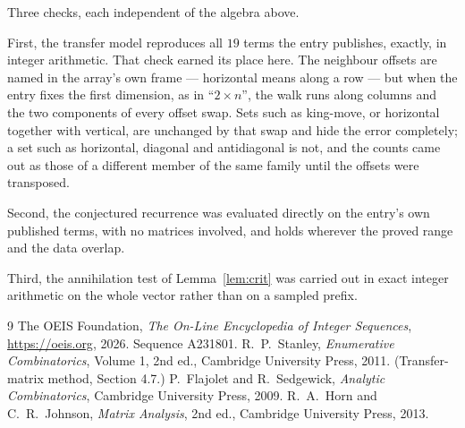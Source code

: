 \documentclass[11pt,a4paper]{article}
\theoremstyle{plain}
\theoremstyle{definition}
\begin{document}
Three checks, each independent of the algebra above.

First, the transfer model reproduces all $19$ terms the entry publishes, exactly, in
integer arithmetic. That check earned its place here. The neighbour offsets are named in the
array's own frame --- horizontal means along a row --- but when the entry fixes the first
dimension, as in ``$2\times n$'', the walk runs along columns and the two components of every
offset swap. Sets such as king-move, or horizontal together with vertical, are unchanged by
that swap and hide the error completely; a set such as horizontal, diagonal and antidiagonal
is not, and the counts came out as those of a different member of the same family until the
offsets were transposed.

Second, the conjectured recurrence was evaluated directly on the entry's own published terms,
with no matrices involved, and holds wherever the proved range and the data overlap.

Third, the annihilation test of Lemma~\ref{lem:crit} was carried out in exact integer
arithmetic on the whole vector rather than on a sampled prefix.

\begin{thebibliography}{9}
 The OEIS Foundation, \emph{The On-Line Encyclopedia of Integer
Sequences}, \url{https://oeis.org}, 2026. Sequence A231801.
 R.~P.~Stanley, \emph{Enumerative Combinatorics}, Volume 1, 2nd ed.,
Cambridge University Press, 2011. (Transfer-matrix method, Section 4.7.)
 P.~Flajolet and R.~Sedgewick, \emph{Analytic Combinatorics}, Cambridge
University Press, 2009.
 R.~A.~Horn and C.~R.~Johnson, \emph{Matrix Analysis}, 2nd ed., Cambridge
University Press, 2013.
\end{thebibliography}
\end{document}
